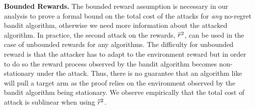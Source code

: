 \textbf{Bounded Rewards.}  The bounded reward assumption is necessary in our analysis to prove a formal bound on the total cost of the attacks for \textit{any} no-regret bandit algorithm, otherwise we need more information about the attacked algorithm. In practice, the second attack on the rewards, $\widetilde{r}^{2}$, can be used in the case of unbounded rewards for any
algorithms. The difficulty for unbounded reward is that the attacker has to adapt to the environment reward but in order to do so the reward process observed by the bandit algorithm becomes non-stationary under the attack. Thus, there is no guarantee that an algorithm like \linucb will pull a target arm as the proof relies on the environment observed by the bandit algorithm being stationary. %
We observe empirically that the total cost of attack is sublinear when using $\widetilde{r}^{2}$.

